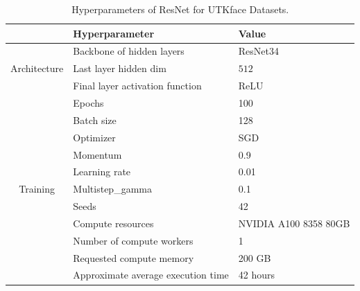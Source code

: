 \begin{table}[h!]
\caption{Hyperparameters of ResNet for UTKface Datasets.}
\label{table:UTK_Resnet34}
\vskip 0.15in
\begin{center}
\begin{small}
\begin{tabular}{cll}
\toprule
    & \textbf{Hyperparameter} & \textbf{Value}  \\
\midrule
    & Backbone of hidden layers & ResNet34 \\
  Architecture  & Last layer hidden dim & $512$  \\ 
    & Final layer activation function & ReLU  \\ 
\midrule
    & Epochs & 100 \\
    & Batch size & 128 \\
    & Optimizer & SGD \\
    & Momentum & 0.9 \\
    & Learning rate & 0.01 \\
Training    & Multistep\_gamma & 0.1 \\
    & Seeds & 42\\
    & Compute resources & NVIDIA A100 8358 80GB \\
    & Number of compute workers & 1 \\
    & Requested compute memory & 200 GB \\
    & Approximate average execution time & 42 hours\\
    
    
\bottomrule
\end{tabular}
\end{small}
\end{center}
\end{table} 